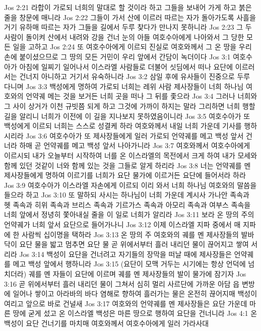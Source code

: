Jos 2:21  라합이 가로되 너희의 말대로 할 것이라 하고 그들을 보내어 가게 하고 붉은 줄을 창문에 매니라
Jos 2:22  그들이 가서 산에 이르러 따르는 자가 돌아가도록 사흘을 거기 유하매 따르는 자가 그들을 길에서 두루 찾다가 만나지 못하니라
Jos 2:23  그 두 사람이 돌이켜 산에서 내려와 강을 건너 눈의 아들 여호수아에게 나아와서 그 당한 모든 일을 고하고
Jos 2:24  또 여호수아에게 이르되 진실로 여호와께서 그 온 땅을 우리 손에 붙이셨으므로 그 땅의 모든 거민이 우리 앞에서 간담이 녹더이다
Jos 3:1  여호수아가 아침에 일찌기 일어나서 이스라엘 사람들로 더불어 싯딤에서 떠나 요단에 이르러서는 건너지 아니하고 거기서 유숙하니라
Jos 3:2  삼일 후에 유사들이 진중으로 두루 다니며
Jos 3:3  백성에게 명하여 가로되 너희는 레위 사람 제사장들이 너희 하나님 여호와의 언약궤 메는 것을 보거든 너희 곳을 떠나 그 뒤를 좇으라
Jos 3:4  그러나 너희와 그 사이 상거가 이천 규빗쯤 되게 하고 그것에 가까이 하지는 말라 그리하면 너희 행할 길을 알리니 너희가 이전에 이 길을 지나보지 못하였음이니라
Jos 3:5  여호수아가 또 백성에게 이르되 너희는 스스로 성결케 하라 여호와께서 내일 너희 가운데 기사를 행하시리라
Jos 3:6  여호수아가 또 제사장들에게 일러 가로되 언약궤를 메고 백성 앞서 건너라 하매 곧 언약궤를 메고 백성 앞서 나아가니라
Jos 3:7  여호와께서 여호수아에게 이르시되 내가 오늘부터 시작하여 너를 온 이스라엘의 목전에서 크게 하여 내가 모세와 함께 있던 것같이 너와 함께 있는 것을 그들로 알게 하리라
Jos 3:8  너는 언약궤를 멘 제사장들에게 명하여 이르기를 너희가 요단 물가에 이르거든 요단에 들어서라 하라
Jos 3:9  여호수아가 이스라엘 자손에게 이르되 이리 와서 너희 하나님 여호와의 말씀을 들으라 하고
Jos 3:10  또 말하되 사시는 하나님이 너희 가운데 계시사 가나안 족속과 헷 족속과 히위 족속과 브리스 족속과 기르가스 족속과 아모리 족속과 여부스 족속을 너희 앞에서 정녕히 쫓아내실 줄을 이 일로 너희가 알리라
Jos 3:11  보라 온 땅의 주의 언약궤가 너희 앞서 요단으로 들어가나니
Jos 3:12  이제 이스라엘 지파 중에서 매 지파에 한 사람씩 십이명을 택하라
Jos 3:13  온 땅의 주 여호와의 궤를 멘 제사장들의 발바닥이 요단 물을 밟고 멈추면 요단 물 곧 위에서부터 흘러 내리던 물이 끊어지고 쌓여 서리라
Jos 3:14  백성이 요단을 건너려고 자기들의 장막을 떠날 때에 제사장들은 언약궤를 메고 백성 앞에서 행하니라
Jos 3:15  (요단이 모맥 거두는 시기에는 항상 언덕에 넘치더라) 궤를 멘 자들이 요단에 이르며 궤를 멘 제사장들의 발이 물가에 잠기자
Jos 3:16  곧 위에서부터 흘러 내리던 물이 그쳐서 심히 멀리 사르단에 가까운 아담 읍 변방에 일어나 쌓이고 아라바의 바다 염해로 향하여 흘러가는 물은 온전히 끊어지매 백성이 여리고 앞으로 바로 건널새
Jos 3:17  여호와의 언약궤를 멘 제사장들은 요단 가운데 마른 땅에 굳게 섰고 온 이스라엘 백성은 마른 땅으로 행하여 요단을 건너니라
Jos 4:1  온 백성이 요단 건너기를 마치매 여호와께서 여호수아에게 일러 가라사대
